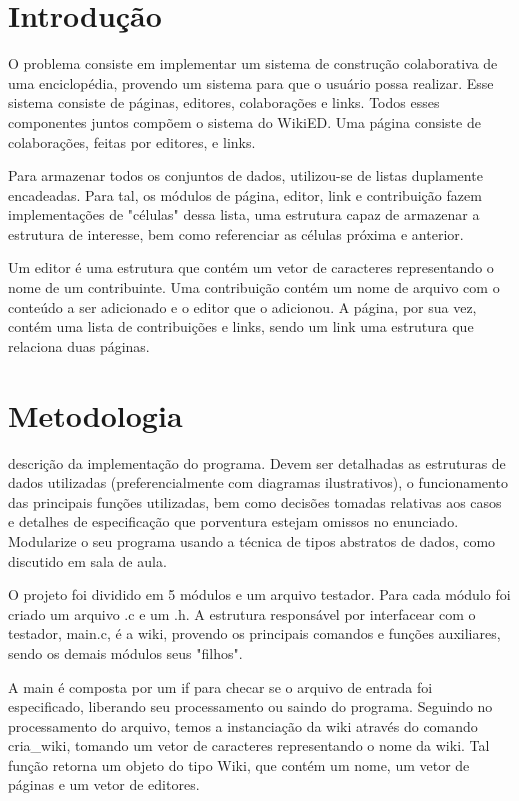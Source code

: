\documentclass[
	12pt,
	oneside,
	a4paper,
	english,
	french,
	spanish,
	brazil,
	]{abntex2}
\begin{document}
\frenchspacing

\imprimircapa

\textual

\chapter{Introdução}
O problema consiste em implementar um sistema de construção colaborativa de uma
enciclopédia, provendo um sistema para que o usuário possa realizar. Esse
sistema consiste de páginas, editores, colaborações e links.  Todos esses
componentes juntos compõem o sistema do WikiED. Uma página consiste de
colaborações, feitas por editores, e links.

Para armazenar todos os conjuntos de dados, utilizou-se de listas duplamente
encadeadas. Para tal, os módulos de página, editor, link e contribuição fazem
implementações de "células" dessa lista, uma estrutura capaz de armazenar a
estrutura de interesse, bem como referenciar as células próxima e anterior.

Um editor é uma estrutura que contém um vetor de caracteres representando o
nome de um contribuinte. Uma contribuição contém um nome de arquivo com o
conteúdo a ser adicionado e o editor que o adicionou. A página, por sua vez,
contém uma lista de contribuições e links, sendo um link uma estrutura que
relaciona duas páginas.

\chapter{Metodologia}
descrição da implementação do programa. Devem ser detalhadas as estruturas de
dados utilizadas (preferencialmente com diagramas ilustrativos), o
funcionamento das principais funções utilizadas, bem como decisões tomadas
relativas aos casos e detalhes de especificação que porventura estejam omissos
no enunciado. Modularize o seu programa usando a técnica de tipos abstratos de
dados, como discutido em sala de aula.

O projeto foi dividido em 5 módulos e um arquivo testador. Para cada módulo foi
criado um arquivo .c e um .h. A estrutura responsável por interfacear com o
testador, main.c, é a wiki, provendo os principais comandos e funções
auxiliares, sendo os demais módulos seus "filhos".

A main é composta por um if para checar se o arquivo de entrada foi
especificado, liberando seu processamento ou saindo do programa. Seguindo no
processamento do arquivo, temos a instanciação da wiki através do comando
cria\_wiki, tomando um vetor de caracteres representando o nome da wiki. Tal
função retorna um objeto do tipo Wiki, que contém um nome, um vetor de páginas
e um vetor de editores.
\end{document}
